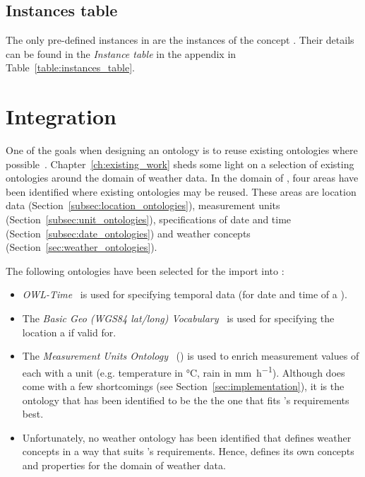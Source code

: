 \subsection{Instances table}
\label{subsec:instances_table}

The only pre-defined instances in \smarthomeweather are the instances of the concept . Their details can be found in the \emph{Instance table} in the appendix in Table~\ref{table:instances_table}.

\section{Integration}
\label{sec:integration}

One of the goals when designing an ontology is to reuse existing ontologies where possible~\cite{reuse1,reuse2}. Chapter~\ref{ch:existing_work} sheds some light on a selection of existing ontologies around the domain of weather data. In the domain of \smarthomeweather, four areas have been identified where existing ontologies may be reused. These areas are location data (Section~\ref{subsec:location_ontologies}), measurement units (Section~\ref{subsec:unit_ontologies}), specifications of date and time (Section~\ref{subsec:date_ontologies}) and weather concepts (Section~\ref{sec:weather_ontologies}).

The following ontologies have been selected for the import into \smarthomeweather:
\begin{itemize}
  \item \emph{OWL-Time}~\cite{owl-time} is used for specifying temporal data (for date and time of a ).
  \item The \emph{Basic Geo (WGS84 lat/long) Vocabulary}~\cite{wgs84_vocabulary} is used for specifying the location a  if valid for.
  \item The \emph{Measurement Units Ontology}~\cite{MUO} (\muo) is used to enrich measurement values of each  with a unit (e.g. temperature in \si{\celsius}, rain in \si{\milli\metre\per\hour}). Although \muo does come with a few shortcomings (see Section~\ref{sec:implementation}), it is the ontology that has been identified to be the the one that fits \smarthomeweather's requirements best.
  \item Unfortunately, no weather ontology has been identified that defines weather concepts in a way that suits \smarthomeweather's requirements. Hence, \smarthomeweather defines its own concepts and properties for the domain of weather data.
\end{itemize}

